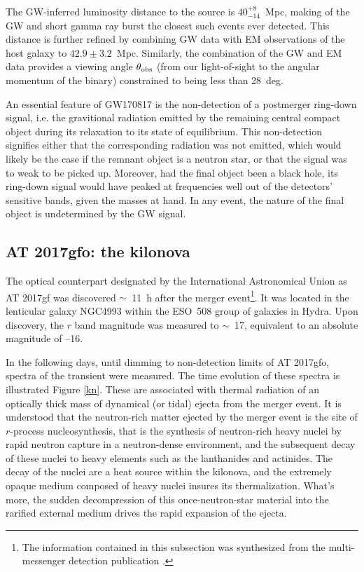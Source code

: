 The GW-inferred luminosity distance to the source is $40_{-14}^{+8}$~Mpc, making of the GW and short gamma ray burst the closest such events ever detected. This distance is further refined by combining GW data with EM observations of the host galaxy to $42.9\pm3.2$~Mpc. Similarly, the combination of the GW and EM data provides a viewing angle $\theta_{\mathrm{obs}}$ (from our light-of-sight to the angular momentum of the binary) constrained to being less than 28~deg.

An essential feature of GW170817 is the non-detection of a postmerger ring-down signal, i.e. the gravitional radiation emitted by the remaining central compact object during its relaxation to its state of equilibrium. This non-detection signifies either that the corresponding radiation was not emitted, which would likely be the case if the remnant object is a neutron star, or that the signal was to weak to be picked up. Moreover, had the final object been a black hole, its ring-down signal would have peaked at frequencies well out of the detectors' sensitive bands, given the masses at hand. In any event, the nature of the final object is undetermined by the GW signal.



\subsection{AT 2017gfo: the kilonova}
\label{kilonova}
The optical counterpart designated by the International Astronomical Union as AT 2017gf was discovered $\sim$~11~h after the merger event\footnote{The information contained in this subsection was synthesized from the multi-messenger detection publication \citep{51}.}. It was located in the lenticular galaxy NGC4993 within the ESO~508 group of galaxies in Hydra. Upon discovery, the $r$ band magnitude was measured to $\sim$~17, equivalent to an absolute magnitude of --16.

In the following days, until dimming to non-detection limits of AT 2017gfo, spectra of the transient were measured. The time evolution of these spectra is illustrated Figure \ref{kn}. These are associated with thermal radiation of an optically thick mass of dynamical (or tidal) ejecta from the merger event. It is understood that the neutron-rich matter ejected by the merger event is the site of $r$-process nucleosynthesis, that is the synthesis of neutron-rich heavy nuclei by rapid neutron capture in a neutron-dense environment, and the subsequent decay of these nuclei to heavy elements such as the lanthanides and actinides. The decay of the nuclei are a heat source within the kilonova, and the extremely opaque medium composed of heavy nuclei insures its thermalization. What's more, the sudden decompression of this once-neutron-star material into the rarified external medium drives the rapid expansion of the ejecta.

